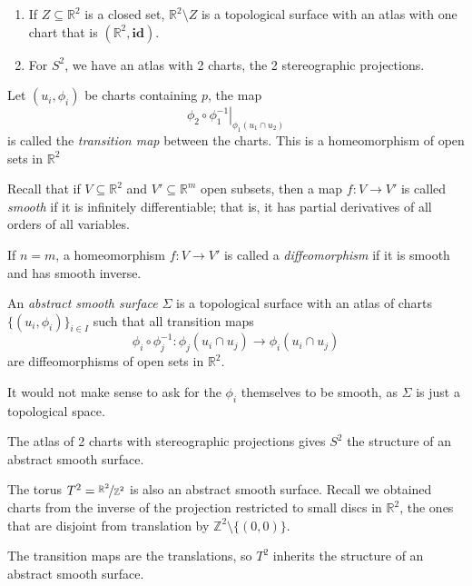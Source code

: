 \begin{example}
    \leavevmode
    \begin{enumerate}
        \item If \(Z \subseteq \mathbb{R}^2\) is a closed set, \(\mathbb{R}^2 \setminus Z\) is a topological surface with an atlas with one chart that is \((\mathbb{R}^2,\mathbf{id})\).
        \item For \(S^2\), we have an atlas with 2 charts, the 2 stereographic projections.
    \end{enumerate}
\end{example}
\begin{definition}{}{}
    Let \((u_i, \phi_i)\) be charts containing \(p\), the map \[\left.\phi_2 \circ \phi_1^{-1} \right|_{\phi_1 (u_1\cap u_2)}\] is called the \textit{transition map} between the charts. This is a homeomorphism of open sets in \(\mathbb{R}^2\)
\end{definition}
Recall that if \(V \subseteq \mathbb{R}^2\) and \(V' \subseteq \mathbb{R}^m\) open subsets, then a map \(f: V \to V'\) is called \textit{smooth} if it is infinitely differentiable; that is, it has partial derivatives of all orders of all variables.

If \(n = m\), a homeomorphism \(f: V \to V'\) is called a \textit{diffeomorphism} if it is smooth and has smooth inverse.

\begin{definition}{}{}
    An \textit{abstract smooth surface} \(\Sigma\) is a topological surface with an atlas of charts \(\{(u_i, \phi_i)\}_{i\in I}\) such that all transition maps
    \[
        \phi_i \circ \phi_j^{-1}: \phi_j(u_i\cap u_j) \to \phi_i(u_i \cap u_j)
    \]
    are diffeomorphisms of open sets in \(\mathbb{R}^2\).
\end{definition}
\begin{note}
    It would not make sense to ask for the \(\phi_i\) themselves to be smooth, as \(\Sigma\) is just a topological space.
\end{note}
\begin{example}
    The atlas of 2 charts with stereographic projections gives \(S^2\) the structure of an abstract smooth surface.
\end{example}
\begin{example}
    The torus \(T^2 = \nicefrac{\mathbb{R}^2}{\mathbb{Z}^2}\) is also an abstract smooth surface. Recall we obtained charts from the inverse of the projection restricted to small discs in \(\mathbb{R}^2\), the ones that are disjoint from translation by \(\mathbb{Z}^2 \setminus \{(0,0)\}\).

    The transition maps are the translations, so \(T^2\) inherits the structure of an abstract smooth surface.
\end{example}